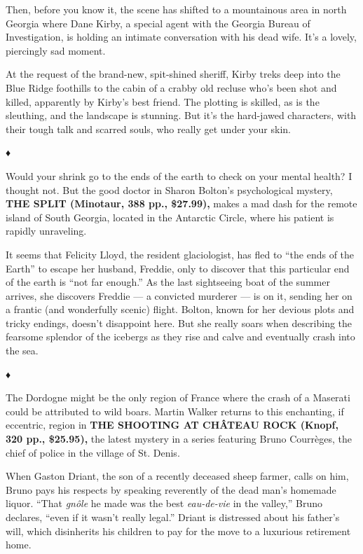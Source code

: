 Then, before you know it, the scene has shifted to a mountainous area in
north Georgia where Dane Kirby, a special agent with the Georgia Bureau
of Investigation, is holding an intimate conversation with his dead
wife. It's a lovely, piercingly sad moment.

At the request of the brand-new, spit-shined sheriff, Kirby treks deep
into the Blue Ridge foothills to the cabin of a crabby old recluse who's
been shot and killed, apparently by Kirby's best friend. The plotting is
skilled, as is the sleuthing, and the landscape is stunning. But it's
the hard-jawed characters, with their tough talk and scarred souls, who
really get under your skin.

♦

Would your shrink go to the ends of the earth to check on your mental
health? I thought not. But the good doctor in Sharon Bolton's
psychological mystery, \textbf{THE SPLIT (Minotaur, 388 pp., \$27.99),}
makes a mad dash for the remote island of South Georgia, located in the
Antarctic Circle, where his patient is rapidly unraveling.

It seems that Felicity Lloyd, the resident glaciologist, has fled to
``the ends of the Earth'' to escape her husband, Freddie, only to
discover that this particular end of the earth is ``not far enough.'' As
the last sightseeing boat of the summer arrives, she discovers Freddie
--- a convicted murderer --- is on it, sending her on a frantic (and
wonderfully scenic) flight. Bolton, known for her devious plots and
tricky endings, doesn't disappoint here. But she really soars when
describing the fearsome splendor of the icebergs as they rise and calve
and eventually crash into the sea.

♦

The Dordogne might be the only region of France where the crash of a
Maserati could be attributed to wild boars. Martin Walker returns to
this enchanting, if eccentric, region in \textbf{THE SHOOTING AT CHÂTEAU
ROCK (Knopf, 320 pp., \$25.95),} the latest mystery in a series
featuring Bruno Courrèges, the chief of police in the village of St.
Denis.

When Gaston Driant, the son of a recently deceased sheep farmer, calls
on him, Bruno pays his respects by speaking reverently of the dead man's
homemade liquor. ``That \emph{gnôle} he made was the best
\emph{eau-de-vie} in the valley,'' Bruno declares, ``even if it wasn't
really legal.'' Driant is distressed about his father's will, which
disinherits his children to pay for the move to a luxurious retirement
home.

